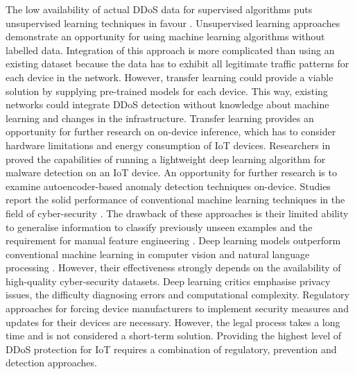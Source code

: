 \documentclass[conference, 11pt]{IEEEtran}
\begin{document}
    The low availability of actual DDoS data for supervised algorithms puts unsupervised learning techniques in favour \cite{xin2018machine}.
    Unsupervised learning approaches demonstrate an opportunity for using machine learning algorithms without labelled data.
    Integration of this approach is more complicated than using an existing dataset because the data has to exhibit all legitimate traffic patterns for each device in the network.
    However, transfer learning could provide a viable solution by supplying pre-trained models for each device.
    This way, existing networks could integrate DDoS detection without knowledge about machine learning and changes in the infrastructure.
    Transfer learning provides an opportunity for further research on on-device inference, which has to consider hardware limitations and energy consumption of IoT devices.
    Researchers in \cite{article:3} proved the capabilities of running a lightweight deep learning algorithm for malware detection on an IoT device.
    An opportunity for further research is to examine autoencoder-based anomaly detection techniques on-device.
    Studies report the solid performance of conventional machine learning techniques in the field of cyber-security \cite{xin2018machine}.
    The drawback of these approaches is their limited ability to generalise information to classify previously unseen examples and the requirement for manual feature engineering \cite{Goodfellow-et-al-2016}.
    Deep learning models outperform conventional machine learning in computer vision and natural language processing \cite{Goodfellow-et-al-2016}.
    However, their effectiveness strongly depends on the availability of high-quality cyber-security datasets.
    Deep learning critics emphasise privacy issues, the difficulty diagnosing errors and computational complexity.
    Regulatory approaches for forcing device manufacturers to implement security measures and updates for their devices are necessary.
    However, the legal process takes a long time and is not considered a short-term solution.
    Providing the highest level of DDoS protection for IoT requires a combination of regulatory, prevention and detection approaches.
\end{document}
